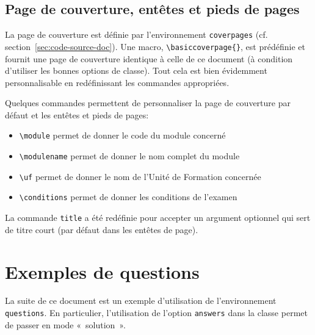 \documentclass[addpoints,fr,biblatex,name,gradetable]{isae-exam}
\begin{document}
\subsection{Page de couverture, entêtes et pieds de pages}
\label{sec:page-de-couverture}

La page de couverture est définie par l'environnement
\lstinline!coverpages! (cf. section~\ref{sec:code-source-doc}). Une
macro, \lstinline!\basiccoverpage{}!, est prédéfinie et fournit une
page de couverture identique à celle de ce document (à condition
d'utiliser les bonnes options de classe). Tout cela est bien
évidemment personnalisable en redéfinissant les commandes appropriées.

Quelques commandes permettent de personnaliser la page de couverture
par défaut et les entêtes et pieds de pages:

\begin{itemize}
\item \lstinline!\module! permet de donner le code du module concerné
\item \lstinline!\modulename! permet de donner le nom complet du module
\item \lstinline!\uf! permet de donner le nom de l'Unité de Formation
  concernée
\item \lstinline!\conditions! permet de donner les conditions de
  l'examen
\end{itemize}

La commande \lstinline!title! a été redéfinie pour accepter un
argument optionnel qui sert de titre court (par défaut dans les
entêtes de page).

\section{Exemples de questions}
\label{sec:exemples-questions}

La suite de ce document est un exemple d'utilisation de
l'environnement \lstinline!questions!. En particulier, l'utilisation
de l'option \lstinline!answers! dans la classe permet de passer en
mode «~solution~».
\end{document}
